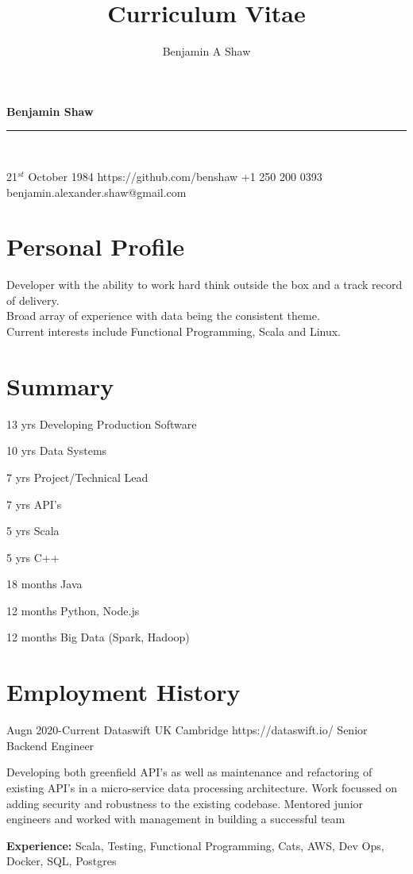 \documentclass{article}
\title{Curriculum Vitae}
\author{Benjamin A Shaw}
\begin{document}
{\huge{\color{slateblue}\textbf{Benjamin Shaw}}}\\
\rule{\textwidth}{0.5mm}\\

\begin{personaldetails}
{21$^{st}$ October 1984}
{https://github.com/benshaw}
{+1 250 200 0393}
{benjamin.alexander.shaw@gmail.com}
\end{personaldetails}


\section*{Personal Profile}
\begin{profile}
Developer with the ability to work hard think outside the box and a track record of delivery. \\
Broad array of experience with data being the consistent theme.\\
Current interests include Functional Programming, Scala and Linux.\\
\end{profile}

\section*{Summary}
\begin{itemize-spaced}
  \item 13 yrs Developing Production Software
  \item 10 yrs Data Systems  
  \item 7 yrs Project/Technical Lead
  \item 7 yrs API's
  \item 5 yrs Scala 
  \item 5 yrs C++
  \item 18 months Java
  \item 12 months Python, Node.js
  \item 12 months Big Data (Spark, Hadoop)
\end{itemize-spaced}

\section*{Employment History}

\begin{job}
{Augn 2020-}{Current}
{Dataswift UK Cambridge}
{https://dataswift.io/}
{Senior Backend Engineer}%
{Developing both greenfield API's as well as maintenance and refactoring of existing API's in a micro-service data processing architecture. Work focussed on adding security and robustness to the existing codebase. Mentored junior engineers and worked with management in building a successful team\\
\rule{0mm}{5mm}\textbf{Experience:} Scala, Testing, Functional Programming, Cats, AWS, Dev Ops, Docker, SQL, Postgres}
\end{job}
\end{document}
